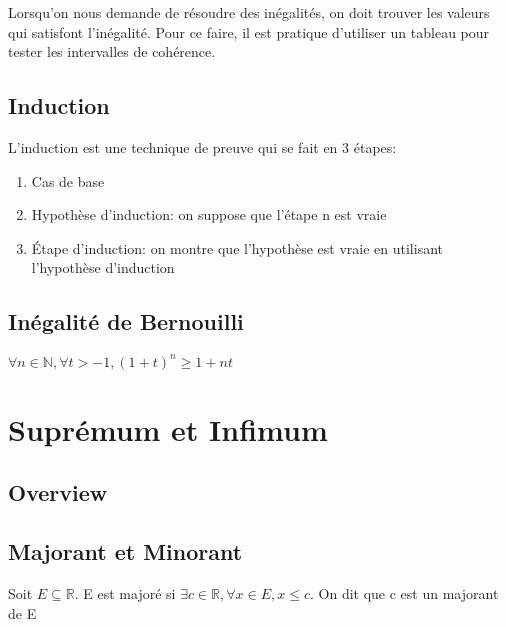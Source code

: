 \documentclass{article}
\begin{document}
\begin{problem}
    Lorsqu'on nous demande de résoudre des inégalités, on doit trouver les
    valeurs qui satisfont l'inégalité. Pour ce faire, il est pratique d'utiliser
    un tableau pour tester les intervalles de cohérence.
\end{problem}

\subsection{Induction}

\begin{intuition}[Induction]
    L'induction est une technique de preuve qui se fait en 3 étapes:
    \begin{enumerate}
	\item Cas de base
	\item Hypothèse d'induction: on suppose que l'étape n est vraie
	\item Étape d'induction: on montre que l'hypothèse est vraie en
	    utilisant l'hypothèse d'induction
    \end{enumerate}
\end{intuition}

\subsection{Inégalité de Bernouilli}

\begin{theorem}
    $ \forall n \in \mathbb{N}, \forall t > -1, (1+t)^n \geq 1+nt$
\end{theorem}

\pagebreak

\section{Suprémum et Infimum}

\subsection{Overview}

\subsection{Majorant et Minorant}

\begin{definition}[Majorant]
    Soit $E \subseteq \mathbb{R}$. E est majoré si $\exists c \in \mathbb{R}, \forall
    x \in E, x \leq c$. On dit que c est un majorant de E
\end{definition}
\end{document}
